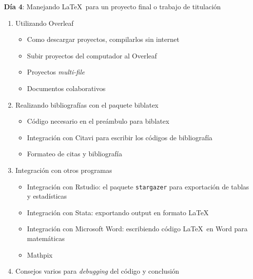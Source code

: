\documentclass[a4paper]{article}
\begin{document}
\textbf{Día 4}: Manejando \LaTeX \ para un proyecto final o trabajo de titulación
\begin{enumerate}
    \item Utilizando Overleaf
\begin{itemize} 
    \item Como descargar proyectos, compilarlos sin internet
    \item Subir proyectos del computador al Overleaf
    \item Proyectos \textit{multi-file}
    \item Documentos colaborativos
\end{itemize}
\item Realizando bibliografías con el paquete \textsf{biblatex}
\begin{itemize}
    \item Código necesario en el preámbulo para \textsf{biblatex}
    \item Integración con Citavi para escribir los códigos de bibliografía
    \item Formateo de citas y bibliografía
    \end{itemize}
    \item Integración con otros programas
\begin{itemize}
    \item Integración con Rstudio: el paquete \texttt{stargazer} para exportación de tablas y estadísticas
    \item Integración con Stata: exportando output en formato \LaTeX
    \item Integración con Microsoft Word: escribiendo código \LaTeX \ en Word para matemáticas
    \item Mathpix
\end{itemize}
\item Consejos varios para \textit{debugging} del código y conclusión
\end{enumerate}
\printbibliography[title=Material de Referencia]
\end{document}
